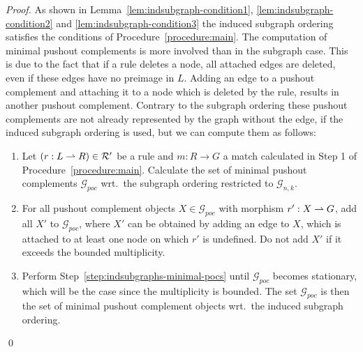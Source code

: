 \documentclass{llncs}
\begin{document}
{\begin{proof}
  As shown in Lemma~\ref{lem:indsubgraph-condition1},
  \ref{lem:indsubgraph-condition2} and
  \ref{lem:indsubgraph-condition3} the induced subgraph ordering
  satisfies the conditions of
  Procedure~\ref{procedure:main}.
  The computation of minimal pushout complements is more involved than
  in the subgraph case. This is due to the fact that if a rule deletes
  a node, all attached edges are deleted, even if these edges have no
  preimage in $L$.  Adding an edge to a pushout complement and
  attaching it to a node which is deleted by the rule, results in
  another pushout complement. Contrary to the subgraph ordering these
  pushout complements are not already represented by the graph without
  the edge, if the induced subgraph ordering is used, but we can
  compute them as follows:
  \begin{enumerate}
    \item Let $(r : L \rightharpoonup R) \in \mathcal{R}'$ be a rule and $m : R \to G$ a 
    match calculated in Step 1 of Procedure~\ref{procedure:main}. Calculate 
    the set of minimal pushout complements $\mathcal{G}_{poc}$ wrt.~the 
    subgraph ordering restricted to $\mathcal{G}_{n,k}$.
    \item \label{step:indsubgraphs-minimal-pocs}
    For all pushout complement objects $X \in \mathcal{G}_{poc}$ with 
    morphism $r' : X \rightharpoonup G$, add all $X'$ to $\mathcal{G}_{poc}$, where $X'$ 
    can be obtained by adding an edge to $X$, which is attached to at least 
    one node on which $r'$ is undefined. Do not add $X'$ if it exceeds the 
    bounded multiplicity.
  \item Perform Step~\ref{step:indsubgraphs-minimal-pocs} until
    $\mathcal{G}_{poc}$ becomes stationary, which will be the case
    since the multiplicity is bounded. The set $\mathcal{G}_{poc}$ is
    then the set of minimal pushout complement objects wrt.~the
    induced subgraph ordering.
  \end{enumerate} 
  \qed
\end{proof}
}
\end{document}
